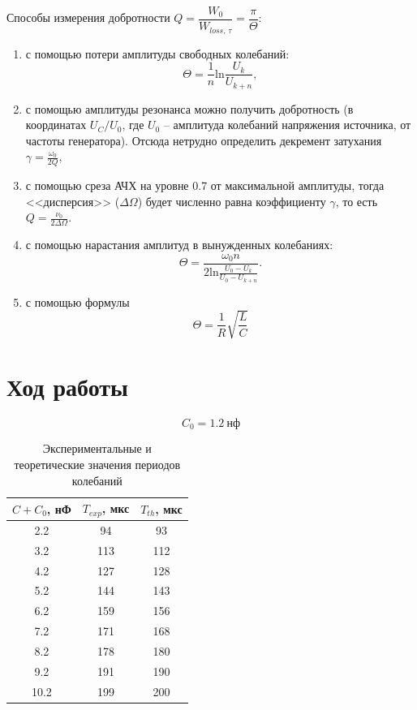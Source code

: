 \documentclass[a4paper, 12pt]{article}
\begin{document}
            Способы измерения добротности $Q = \dfrac{W_0}{W_{loss,\,\tau}} = \dfrac{\pi}{\Theta}$:
            \begin{enumerate}
                \item с помощью потери амплитуды свободных колебаний:
                \begin{equation}
                    \Theta = \frac{1}{n} \text{ln}\frac{U_k}{U_{k+n}},
                \end{equation}
                \item с помощью амплитуды резонанса можно получить добротность (в координатах $U_C/U_0$, где $U_0$ -- амплитуда колебаний напряжения источника, от частоты генератора). Отсюда нетрудно определить декремент затухания $\gamma = \frac{\omega_0}{2Q}$,
                \item с помощью среза АЧХ на уровне 0.7 от максимальной амплитуды, тогда <<дисперсия>> ($\Delta \Omega$) будет численно равна коэффициенту $\gamma$, то есть $Q = \frac{\nu_0}{2 \Delta \Omega}$.
                \item с помощью нарастания амплитуд в вынужденных колебаниях:
                \begin{equation}
                    \Theta = \frac{\omega_0 n}{2\text{ln} \frac{U_0 - U_k}{U_0 - U_{k+n}}}.
                \end{equation}
                \item  с помощью формулы\begin{equation}
                    \Theta = \frac{1}{R}\sqrt{\frac{L}{C}}
                \end{equation}
            \end{enumerate}

    \section{Ход работы}

        $$
            C_0 = 1.2~нф
        $$

        \begin{table}[h]
            \centering
            \begin{tabular}{|c|c|c|}
            \hline
            $C + C_0$, нФ & $T_{exp}$, мкс & $T_{th}$, мкс \\ \hline
            2.2 & 94 & 93 \\
            3.2 & 113 & 112 \\
            4.2 & 127 & 128 \\
            5.2 & 144 & 143 \\
            6.2 & 159 & 156 \\
            7.2 & 171 & 168 \\
            8.2 & 178 & 180 \\
            9.2 & 191 & 190 \\
            10.2 & 199 & 200 \\
            \hline
            \end{tabular}
            \caption{Экспериментальные и теоретические значения периодов колебаний}
        \end{table}
\end{document}
